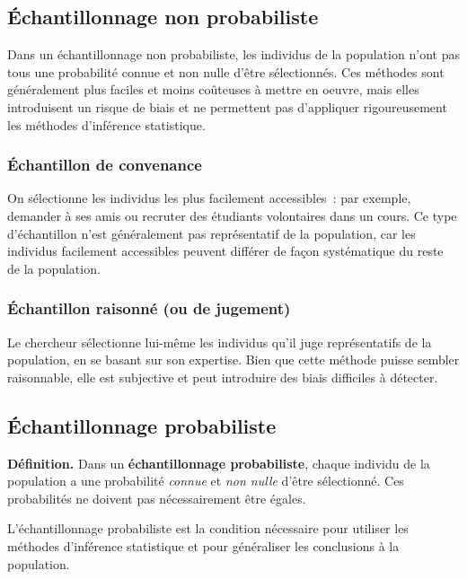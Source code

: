 \documentclass[11pt,french]{article}
\begin{document}
\subsection{Échantillonnage non probabiliste}

Dans un échantillonnage non probabiliste, les individus de la population n'ont pas tous une
probabilité connue et non nulle d'être sélectionnés. Ces méthodes sont généralement plus
faciles et moins coûteuses à mettre en oeuvre, mais elles introduisent un risque de biais et
ne permettent pas d'appliquer rigoureusement les méthodes d'inférence statistique.

\subsubsection{Échantillon de convenance}

On sélectionne les individus les plus facilement accessibles~: par exemple, demander à ses
amis ou recruter des étudiants volontaires dans un cours. Ce type d'échantillon n'est
généralement pas représentatif de la population, car les individus facilement accessibles
peuvent différer de façon systématique du reste de la population.

\subsubsection{Échantillon raisonné (ou de jugement)}

Le chercheur sélectionne lui-même les individus qu'il juge représentatifs de la population,
en se basant sur son expertise. Bien que cette méthode puisse sembler raisonnable, elle est
subjective et peut introduire des biais difficiles à détecter.

\subsection{Échantillonnage probabiliste}

\textbf{Définition.} Dans un \textbf{échantillonnage probabiliste}, chaque individu de la
population a une probabilité \emph{connue} et \emph{non nulle} d'être sélectionné. Ces
probabilités ne doivent pas nécessairement être égales.

L'échantillonnage probabiliste est la condition nécessaire pour utiliser les méthodes
d'inférence statistique et pour généraliser les conclusions à la population.
\end{document}
